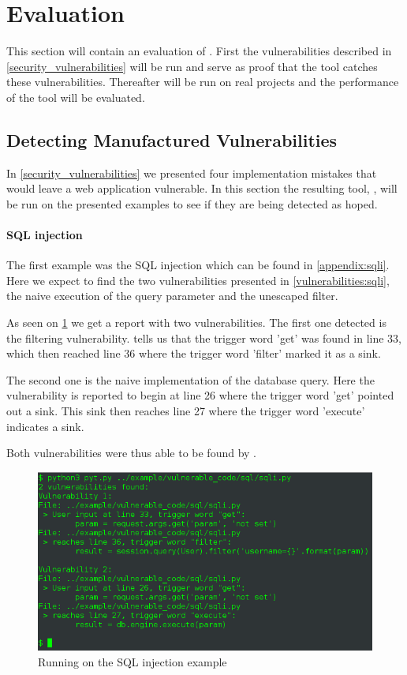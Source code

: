 \section{Evaluation}\label{evaluation}
This section will contain an evaluation of \pyt{}.
First the vulnerabilities described in \cref{security_vulnerabilities} will be run and serve as proof that the tool catches these vulnerabilities.
Thereafter \pyt{} will be run on real projects and the performance of the tool will be evaluated.

\subsection{Detecting Manufactured Vulnerabilities}
In \cref{security_vulnerabilities} we presented four implementation mistakes that would leave a web application vulnerable.
In this section the resulting tool, \pyt{}, will be run on the presented examples to see if they are being detected as hoped.

\paragraph{SQL injection}
The first example was the SQL injection which can be found in \cref{appendix:sqli}.
Here we expect to find the two vulnerabilities presented in \cref{vulnerabilities:sqli}, the naive execution of the query parameter and the unescaped filter.

As seen on \cref{sqli:console} we get a report with two vulnerabilities.
The first one detected is the filtering vulnerability.
\pyt{} tells us that the trigger word 'get' was found in line 33, which then reached line 36 where the trigger word 'filter' marked it as a sink.

The second one is the naive implementation of the database query.
Here the vulnerability is reported to begin at line 26 where the trigger word 'get' pointed out a sink.
This sink then reaches line 27 where the trigger word 'execute' indicates a sink.

Both vulnerabilities were thus able to be found by \pyt{}.

\begin{figure}
  \includegraphics[width=\textwidth]{./figures/sqli_console.png}
  \caption{Running \pyt{} on the SQL injection example}
  \label{sqli:console}
\end{figure}

